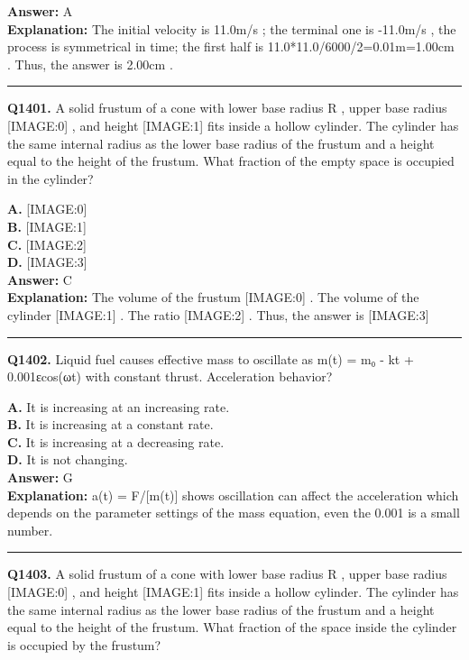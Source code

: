 \documentclass[12pt]{article}
\begin{document}
\textbf{Answer:} A \\
\textbf{Explanation:} The initial velocity is 11.0m/s
; the terminal one is -11.0m/s
, the process is symmetrical in time; the first half is 11.0*11.0/6000/2=0.01m=1.00cm
. Thus, the answer is 2.00cm
.

\hrule
\vspace{1em}


\noindent
\textbf{Q1401.} A solid frustum of a cone with lower base radius R
, upper base radius
[IMAGE:0]
, and height
[IMAGE:1]
fits inside a hollow cylinder. The cylinder has the same internal radius as the lower base radius of the frustum and a height equal to the height of the frustum. What fraction of the empty space is occupied in the cylinder?



\textbf{A.} [IMAGE:0] \\
\textbf{B.} [IMAGE:1] \\
\textbf{C.} [IMAGE:2] \\
\textbf{D.} [IMAGE:3] \\

\textbf{Answer:} C \\
\textbf{Explanation:} The volume of the frustum
[IMAGE:0]
. The volume of the cylinder
[IMAGE:1]
. The ratio
[IMAGE:2]
.
Thus, the answer is
[IMAGE:3]

\hrule
\vspace{1em}


\noindent
\textbf{Q1402.} Liquid fuel causes effective mass to oscillate as m(t) = m₀ - kt + 0.001εcos(ωt) with constant thrust.
Acceleration behavior?



\textbf{A.} It is increasing at an increasing rate. \\
\textbf{B.} It is increasing at a constant rate. \\
\textbf{C.} It is increasing at a decreasing rate. \\
\textbf{D.} It is not changing. \\

\textbf{Answer:} G \\
\textbf{Explanation:} a(t) = F/[m(t)] shows oscillation can affect the acceleration which depends on the parameter settings of the mass equation, even the 0.001 is a small number.

\hrule
\vspace{1em}


\noindent
\textbf{Q1403.} A solid frustum of a cone with lower base radius R
, upper base radius
[IMAGE:0]
, and height
[IMAGE:1]
fits inside a hollow cylinder. The cylinder has the same internal radius as the lower base radius of the frustum and a height equal to the height of the frustum. What fraction of the space inside the cylinder is occupied by the frustum?
\end{document}
